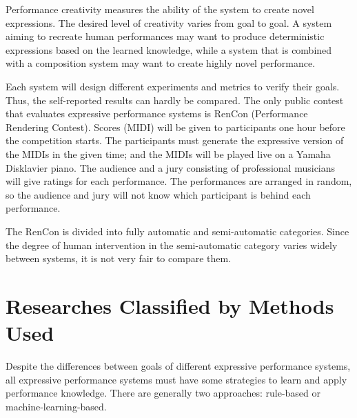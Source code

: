 Performance creativity measures the ability of the system to create novel expressions. The desired level of creativity varies from goal to goal. A system aiming to recreate human performances may want to produce deterministic expressions based on the learned knowledge, while a system that is combined with a composition system may want to create highly novel performance. 


Each system will design different experiments and metrics to verify their goals. Thus, the self-reported results can hardly be compared. The only public contest that evaluates expressive performance systems is RenCon (Performance Rendering Contest)\cite{RenCon}. Scores (MIDI) will be given to participants one hour before the competition starts. The participants must generate the expressive version of the MIDIs in the given time; and the MIDIs will be played live on a Yamaha Disklavier piano. The audience and a jury consisting of professional musicians will give ratings for each performance. The performances are arranged in random, so the audience and jury will not know which participant is behind each performance.

The RenCon is divided into fully automatic and semi-automatic categories. Since the degree of human intervention in the semi-automatic category varies widely between systems, it is not very fair to compare them.



\section{Researches Classified by Methods Used}
Despite the differences between goals of different expressive performance systems, all expressive performance systems must have some strategies to learn and apply performance knowledge. There are generally two approaches: rule-based or machine-learning-based.

